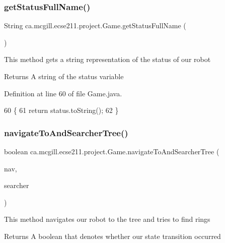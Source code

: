 \subsubsection{\texorpdfstring{get\+Status\+Full\+Name()}{getStatusFullName()}}
{\footnotesize\ttfamily String ca.\+mcgill.\+ecse211.\+project.\+Game.\+get\+Status\+Full\+Name (\begin{DoxyParamCaption}{ }\end{DoxyParamCaption})}

This method gets a string representation of the status of our robot

\begin{DoxyReturn}{Returns}
A string of the status variable 
\end{DoxyReturn}


Definition at line 60 of file Game.\+java.


\begin{DoxyCode}
60                                     \{
61     \textcolor{keywordflow}{return} status.toString();
62   \}
\end{DoxyCode}
\mbox{\label{enumca_1_1mcgill_1_1ecse211_1_1project_1_1_game_a623ef585f41a45d778590392314ea352}} 
\subsubsection{\texorpdfstring{navigate\+To\+And\+Searcher\+Tree()}{navigateToAndSearcherTree()}}
{\footnotesize\ttfamily boolean ca.\+mcgill.\+ecse211.\+project.\+Game.\+navigate\+To\+And\+Searcher\+Tree (\begin{DoxyParamCaption}\item[{\hyperlink{classca_1_1mcgill_1_1ecse211_1_1project_1_1_navigation}{Navigation}}]{nav,  }\item[{\hyperlink{classca_1_1mcgill_1_1ecse211_1_1threads_1_1_ring_searcher}{Ring\+Searcher}}]{searcher }\end{DoxyParamCaption})}

This method navigates our robot to the tree and tries to find rings

\begin{DoxyReturn}{Returns}
A boolean that denotes whether our state transition occurred 
\end{DoxyReturn}


